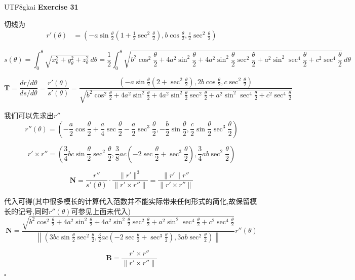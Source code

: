 \documentclass[11pt,hyperref,a4paper,UTF8]{ctexart}
\newenvironment{exercise}[1]{%
{\textbf{Exercise #1} \\ 
    }
}{
  \hfill $\square$ 
  \par\bigskip 
}
\newcommand{\parameter}[1]{\left(#1\right)}
\newcommand{\ve}{\boldsymbol}
\begin{document}
\begin{CJK}{UTF8}{gkai}
\begin{exercise}{31}
    切线为
    \[
    \begin{aligned}    
        r'(\theta) &= \parameter{-a\sin \frac{\theta}{2} \parameter{1 + \frac{1}{2}\sec^2 \frac{\theta}{2}},b \cos \frac{\theta}{2} , \frac{c}{2}\sec^2 \frac{\theta}{2}}
    \end{aligned}    
    \]

    \[s(\theta) = \int_{0}^{\theta}\sqrt{x_\theta^2 + y_\theta^2 + z_\theta^2} \, d\theta = \frac{1}{2}\int_{0}^{\theta} \sqrt{b^2 \cos^2 \frac{\theta}{2} + 4 a^2\sin^2 \frac{\theta}{2} + 4a^2 \sin^2 \frac{\theta}{2} \sec^2 \frac{\theta}{2} + a^2 \sin^2 \sec^4 \frac{\theta}{2} + c^2 \sec^4 \frac{\theta}{2}}\, d\theta\]

    \[\ve{T} = \frac{dr/d\theta}{ds/d\theta} = \frac{r'(\theta)}{s'(\theta)} = \frac{\parameter{-a\sin \frac{\theta}{2} \parameter{2 + \sec^2 \frac{\theta}{2}},2b \cos \frac{\theta}{2} , c\sec^2 \frac{\theta}{2}}}{\sqrt{b^2 \cos^2 \frac{\theta}{2} + 4 a^2\sin^2 \frac{\theta}{2} + 4a^2 \sin^2 \frac{\theta}{2} \sec^2 \frac{\theta}{2} + a^2 \sin^2 \sec^4 \frac{\theta}{2} + c^2 \sec^4 \frac{\theta}{2}}}\]

    我们可以先求出$r''$
    \[r''(\theta) = \parameter{-\frac{a}{2}\cos \frac{\theta}{2} + \frac{a}{4}\sec \frac{\theta}{2} - \frac{a}{2}\sec^3 \frac{\theta}{2},-\frac{b}{2}\sin \frac{\theta}{2},\frac{c}{2}\sin \frac{\theta}{2} \sec^3 \frac{\theta}{2}}\]

    \[r' \times r'' = \parameter{\frac{3}{4}bc \sin \frac{\theta}{2} \sec^2 \frac{\theta}{2},\frac{3}{8}ac(-2\sec \frac{\theta}{2} + \sec^3 \frac{\theta}{2}),\frac{3}{4}ab\sec^2 \frac{\theta}{2}}\]

    \[\ve{N} = \frac{r''}{s'(\theta)} \cdot \frac{\|r'\|^3}{\|r'\times r''\|} = \frac{\|r'\| r''}{\|r'\times r''\|}\]

    代入可得(其中很多模长的计算代入范数并不能实际带来任何形式的简化,故保留模长的记号,同时$r''(\theta)$可参见上面未代入)
    \[\ve{N} = \frac{\sqrt{b^2 \cos^2 \frac{\theta}{2} + 4 a^2\sin^2 \frac{\theta}{2} + 4a^2 \sin^2 \frac{\theta}{2} \sec^2 \frac{\theta}{2} + a^2 \sin^2 \sec^4 \frac{\theta}{2} + c^2 \sec^4 \frac{\theta}{2}}}{\left\|\parameter{3bc \sin \frac{\theta}{2} \sec^2 \frac{\theta}{2},\frac{3}{2}ac(-2\sec \frac{\theta}{2} + \sec^3 \frac{\theta}{2}),
    3ab\sec^2 \frac{\theta}{2}}\right\|} r''(\theta)\]

    \[\ve{B} = \frac{ r' \times r''}{\|r'\times r''\|}\]


\end{exercise}
\end{CJK}
\end{document}
